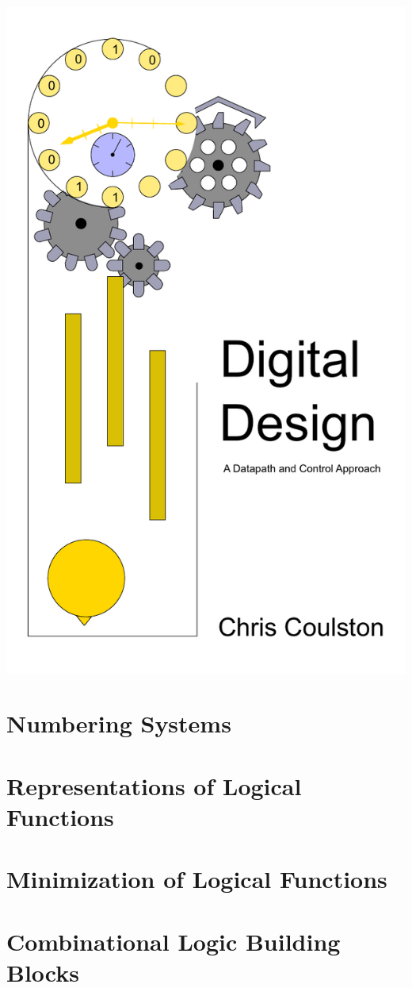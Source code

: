 \documentclass[letterpaper, 10pt]{memoir}
\begin{document}
\frontmatter
 \title{}
\includegraphics{./Fig/colorCover}
 \maketitle
 
 

\tableofcontents
\showanswers

\mainmatter

\chapter{Numbering Systems}


\chapter{Representations of Logical Functions}


\chapter{Minimization of Logical Functions}


\chapter{Combinational Logic Building Blocks}

\end{document}
